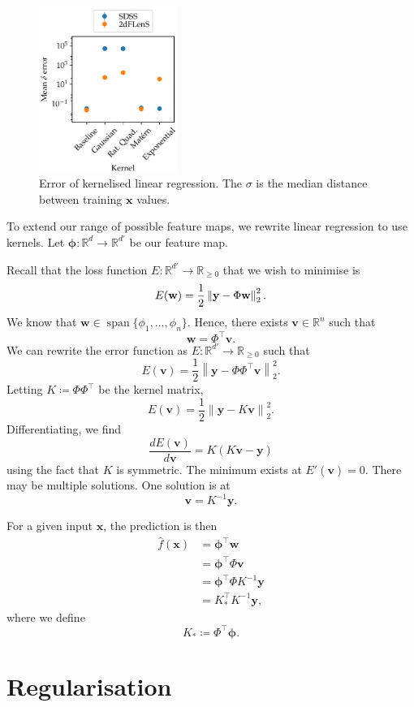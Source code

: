 \documentclass[11pt,twoside,openright]{report}
\newcommand\bphi{\bm{\phi}}
\newcommand\bbR{\mathbb{R}}
\newcommand\bv{\mathbf{v}}
\newcommand\bw{\mathbf{w}}
\newcommand\bx{\mathbf{x}}
\newcommand\by{\mathbf{y}}
\newcommand\norm[1]{\left\|#1\right\|}
\DeclareMathOperator{\spn}{span}
\begin{document}
  \begin{figure}
    \centering
    \includegraphics[width=0.4\textwidth]{linreg_kernelised.pdf}
    \caption{Error of kernelised linear regression. The $\sigma$ is the median distance between training $\bx$ values.}
    \label{fig:linreg_kernelised}
  \end{figure}

To extend our range of possible feature maps, we rewrite linear regression to use kernels. Let $\bphi : \bbR^{d} \to \bbR^{d'}$ be our feature map.

Recall that the loss function $E : \bbR^{d'} \to \bbR_{\geq0}$ that we wish to minimise is \[
    E(\bw) = \frac{1}{2}\norm{\by - \Phi\bw}_2^2 \text.
\] We know that $\bw \in \spn\{\phi_1, \dots, \phi_n\}$. Hence, there exists $\bv \in \bbR^n$ such that \[
    \bw = \Phi^\top\bv \text{.}
\] We can rewrite the error function as $E : \bbR^{d'} \to \bbR_{\geq0}$ such that \[
    E(\bv) = \frac{1}{2}\norm{\by - \Phi\Phi^\top\bv}_2^2 \text{.}
\] Letting $K \coloneqq \Phi\Phi^\top$ be the kernel matrix,\[
    E(\bv) = \frac{1}{2}\norm{\by - K\bv}_2^2\text{.}
\] Differentiating, we find \[
    \frac{dE(\bv)}{d\bv} = K(K\bv - \by)
\] using the fact that $K$ is symmetric. The minimum exists at $E'(\bv) = 0$. There may be multiple solutions. One solution is at \[
    \bv = K^{-1}\by \text{.}
\]

For a given input $\bx$, the prediction is then \begin{align*}
    \hat f(\bx) &= \bphi^\top \bw \\
    &= \bphi^\top \Phi \bv \\
    &= \bphi^\top \Phi K^{-1}\by \\
    &= K_*^\top K^{-1}\by \text{,}
\end{align*} where we define \[
    K_* \coloneqq \Phi^\top\bphi \text{.}
\]

\section{Regularisation}
\end{document}
